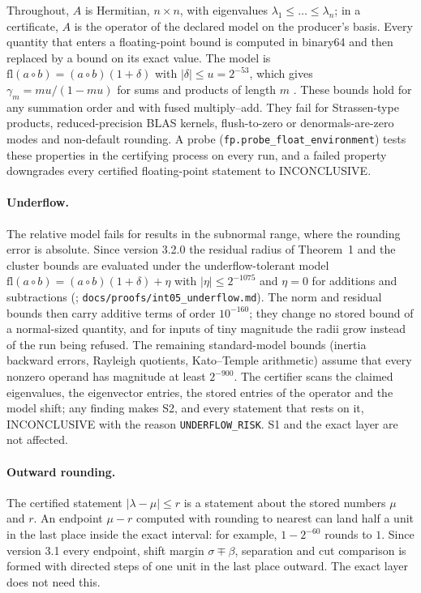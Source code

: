 \documentclass[11pt,a4paper]{article}
\newcommand{\code}[1]{\texttt{#1}}
\newcommand{\status}[1]{\textsf{#1}}
\newcommand{\INC}{\status{INCONCLUSIVE}}
\newcommand{\fl}{\mathrm{fl}}
\newcommand{\abs}[1]{\lvert #1\rvert}
\begin{document}
Throughout, $A$ is Hermitian, $n\times n$, with eigenvalues $\lambda_1\le\dots\le\lambda_n$; in a certificate, $A$ is
the operator of the declared model on the producer's basis. Every quantity that enters a floating-point bound is
computed in binary64 and then replaced by a bound on its exact value. The model is $\fl(a\circ b)=(a\circ b)(1+\delta)$
with $\abs{\delta}\le u=2^{-53}$, which gives $\gamma_m=mu/(1-mu)$ for sums and products of length $m$
\cite{Higham2002}. These bounds hold for any summation order and with fused multiply--add. They fail for Strassen-type
products, reduced-precision BLAS kernels, flush-to-zero or denormals-are-zero modes and non-default rounding. A probe
(\code{fp.probe\_float\_environment}) tests these properties in the certifying process on every run, and a failed
property downgrades every certified floating-point statement to \INC.

\paragraph{Underflow.}
The relative model fails for results in the subnormal range, where the rounding error is absolute. Since version 3.2.0
the residual radius of Theorem~1 and the cluster bounds are evaluated under the underflow-tolerant model
$\fl(a\circ b)=(a\circ b)(1+\delta)+\eta$ with $\abs{\eta}\le 2^{-1075}$ and $\eta=0$ for additions and subtractions
(\cite[eq.~(2.6)]{Higham2002}; \code{docs/proofs/int05\_underflow.md}). The norm and residual bounds then carry
additive terms of order $10^{-160}$; they change no stored bound of a normal-sized quantity, and for inputs of tiny
magnitude the radii grow instead of the run being refused. The remaining standard-model bounds (inertia backward
errors, Rayleigh quotients, Kato--Temple arithmetic) assume that every nonzero operand has magnitude at least
$2^{-900}$. The certifier scans the claimed eigenvalues, the eigenvector entries, the stored entries of the operator
and the model shift; any finding makes S2, and every statement that rests on it, \INC{} with the reason
\code{UNDERFLOW\_RISK}. S1 and the exact layer are not affected.

\paragraph{Outward rounding.}
The certified statement $\abs{\lambda-\mu}\le r$ is a statement about the stored numbers $\mu$ and $r$. An endpoint
$\mu-r$ computed with rounding to nearest can land half a unit in the last place inside the exact interval: for
example, $1-2^{-60}$ rounds to $1$. Since version 3.1 every endpoint, shift margin $\sigma\mp\beta$, separation and cut
comparison is formed with directed steps of one unit in the last place outward. The exact layer does not need this.
\end{document}
